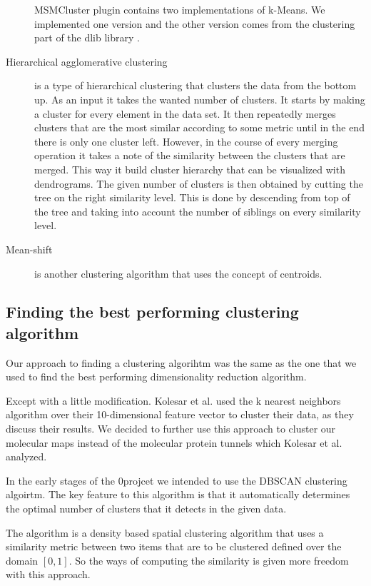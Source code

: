 \documentclass[journal]{vgtc}       %
\begin{document}
\begin{description}
MSMCluster plugin contains two implementations of k-Means. We implemented one version and the other version comes from the clustering part of the dlib library \cite{dlib09}.
\item [Hierarchical agglomerative clustering] is a type of hierarchical clustering that clusters the data from the bottom up. As an input it takes the wanted number of clusters. It starts by making a cluster for every element in the data set. It then repeatedly merges clusters that are the most similar according to some metric until in the end there is only one cluster left. However, in the course of every merging operation it takes a note of the similarity between the clusters that are merged. This way it build cluster hierarchy that can be visualized with dendrograms. The given number of clusters is then obtained by cutting the tree on the right similarity level. This is done by descending from top of the tree and taking into account the number of siblings on every similarity level.
\item [Mean-shift] is another clustering algorithm that uses the concept of centroids. 
\end{description}




\subsection{Finding the best performing clustering algorithm}
Our approach to finding a clustering algorihtm was the same as the one that we used  to find the best performing dimensionality reduction algorithm.

Except with a little modification. Kolesar et al. \cite{kolesar} used the k nearest neighbors algorithm over their 10-dimensional feature vector to cluster their data, as they discuss their results. We decided to further use this approach to cluster our molecular maps instead of the molecular protein tunnels which Kolesar et al. analyzed.


In the early stages of the 0projcet we intended to use the DBSCAN clustering algoirtm. 
The key feature to this algorithm is that it automatically determines the optimal number of clusters that it detects in the given data. 

The algorithm is a density based spatial clustering algorithm that uses a similarity metric between two items that are to be  clustered defined over the domain \([0,1]\). So the ways of computing the similarity is given more freedom with this approach.
\end{document}
